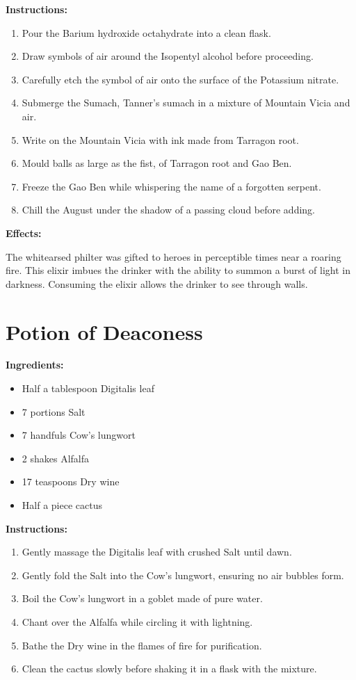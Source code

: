 \documentclass{article}
\begin{document}
\textbf{Instructions:}

\begin{enumerate}
  \item Pour the Barium hydroxide octahydrate into a clean flask.
  \item Draw symbols of air around the Isopentyl alcohol before proceeding.
  \item Carefully etch the symbol of air onto the surface of the Potassium nitrate.
  \item Submerge the Sumach, Tanner's sumach in a mixture of Mountain Vicia and air.
  \item Write on the Mountain Vicia with ink made from Tarragon root.
  \item Mould balls as large as the fist, of Tarragon root and Gao Ben.
  \item Freeze the Gao Ben while whispering the name of a forgotten serpent.
  \item Chill the August under the shadow of a passing cloud before adding.
\end{enumerate}

\textbf{Effects:}

The whitearsed philter was gifted to heroes in perceptible times near a roaring fire. This elixir imbues the drinker with the ability to summon a burst of light in darkness. Consuming the elixir allows the drinker to see through walls.

\newpage
\section*{Potion of Deaconess}

\textbf{Ingredients:}

\begin{itemize}
  \item Half a tablespoon Digitalis leaf
  \item 7 portions Salt
  \item 7 handfuls Cow's lungwort
  \item 2 shakes Alfalfa
  \item 17 teaspoons Dry wine
  \item Half a piece cactus
\end{itemize}

\textbf{Instructions:}

\begin{enumerate}
  \item Gently massage the Digitalis leaf with crushed Salt until dawn.
  \item Gently fold the Salt into the Cow's lungwort, ensuring no air bubbles form.
  \item Boil the Cow's lungwort in a goblet made of pure water.
  \item Chant over the Alfalfa while circling it with lightning.
  \item Bathe the Dry wine in the flames of fire for purification.
  \item Clean the cactus slowly before shaking it in a flask with the mixture.
\end{enumerate}
\end{document}
